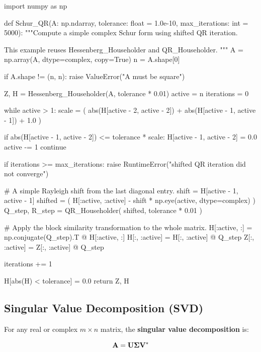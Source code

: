 \begin{python}
import numpy as np


def Schur_QR(A: np.ndarray,
             tolerance: float = 1.0e-10,
             max_iterations: int = 5000):
    """Compute a simple complex Schur form using shifted QR iteration.

    This example reuses Hessenberg_Householder and QR_Householder.
    """
    A = np.array(A, dtype=complex, copy=True)
    n = A.shape[0]

    if A.shape != (n, n):
        raise ValueError("A must be square")

    Z, H = Hessenberg_Householder(A, tolerance * 0.01)
    active = n
    iterations = 0

    while active > 1:
        scale = (
            abs(H[active - 2, active - 2])
            + abs(H[active - 1, active - 1])
            + 1.0
        )

        if abs(H[active - 1, active - 2]) <= tolerance * scale:
            H[active - 1, active - 2] = 0.0
            active -= 1
            continue

        if iterations >= max_iterations:
            raise RuntimeError("shifted QR iteration did not converge")

        # A simple Rayleigh shift from the last diagonal entry.
        shift = H[active - 1, active - 1]
        shifted = (
            H[:active, :active]
            - shift * np.eye(active, dtype=complex)
        )
        Q_step, R_step = QR_Householder(
            shifted, tolerance * 0.01
        )

        # Apply the block similarity transformation to the whole matrix.
        H[:active, :] = np.conjugate(Q_step).T @ H[:active, :]
        H[:, :active] = H[:, :active] @ Q_step
        Z[:, :active] = Z[:, :active] @ Q_step

        iterations += 1

    H[abs(H) < tolerance] = 0.0
    return Z, H
\end{python}

\subsection{Singular Value Decomposition (SVD)}

For any real or complex $ m\times n $ matrix, the \textbf{singular value
decomposition} is:

\begin{equation}
    \mathbf{A}=\mathbf{U}\mathbf{\Sigma}\mathbf{V}^{*}
\end{equation}

